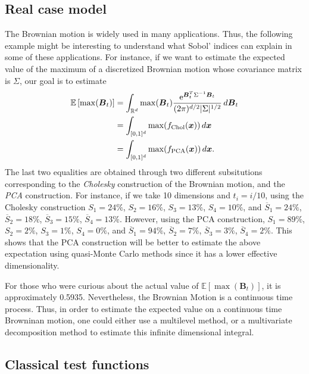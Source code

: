 \documentclass[]{elsarticle}
\theoremstyle{definition}
\newcommand{\bvec}[1]{\boldsymbol{#1}}
\newcommand{\vx}{\bvec{x}}
\begin{document}
\subsection{Real case model}
The Brownian motion is widely used in many applications. Thus, the following example might be interesting to understand what Sobol' indices can explain in some of these applications. For instance, if we want to estimate the expected value of the maximum of a discretized Brownian motion whose covariance matrix is $\Sigma$, our goal is to estimate
\begin{align*}
\mathbb{E} \left[\max(\bvec{B}_t)\right] &= \int_{\mathbb{R}^d} \max(\bvec{B}_t) \frac{{\rm e}^{\bvec{B}_t^T\Sigma^{-1}\bvec{B}_t}}{(2\pi)^{d/2}|\Sigma|^{1/2}}\,d\bvec{B}_t \\
&= \int_{[0,1]^d} \max(f_{\rm Chol}(\vx)) \,d\vx \\
&= \int_{[0,1]^d} \max(f_{\rm PCA}(\vx)) \,d\vx.
\end{align*}
The last two equalities are obtained through two different subsitutions corresponding to the \textit{Cholesky} construction of the Brownian motion, and the \textit{PCA} construction. For instance, if we take 10 dimensions and $t_i=i/10$, using the Cholesky construction $S_{1} = 24\%$, $S_{2} = 16\%$, $S_{3} = 13\%$, $S_{4} = 10\%$, and $\overline{S}_{1}=24\%$, $\overline{S}_{2}=18\%$, $\overline{S}_{3}=15\%$, $\overline{S}_{4} = 13\%$. However, using the PCA construction, $S_{1} = 89\%$, $S_{2} = 2\%$, $S_{3} = 1\%$, $S_{4} = 0\%$, and $\overline{S}_{1}=94\%$, $\overline{S}_{2}=7\%$, $\overline{S}_{3}=3\%$, $\overline{S}_{4} = 2\%$. This shows that the PCA construction will be better to estimate the above expectation using quasi-Monte Carlo methods since it has a lower effective dimensionality.

For those who were curious about the actual value of $\mathbb{E} \left[\max(\bvec{B}_t)\right]$, it is approximately 0.5935. Nevertheless, the Brownian Motion is a continuous time process. Thus, in order to estimate the expected value on a continuous time Browninan motion, one could either use a multilevel method, or a multivariate decomposition method to estimate this infinite dimensional integral.

\subsection{Classical test functions}

\end{document}
